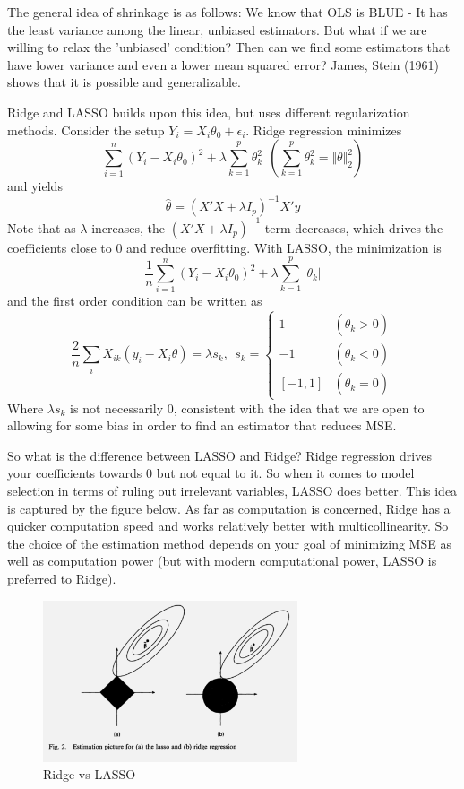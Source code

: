 The general idea of shrinkage is as follows: We know that OLS is BLUE - It has the least variance among the linear, unbiased estimators. But what if we are willing to relax the 'unbiased' condition? Then can we find some estimators that have lower variance and even a lower mean squared error? James, Stein (1961) shows that it is possible and generalizable. \par 
Ridge and LASSO builds upon this idea, but uses different regularization methods. Consider the setup $Y_i=X_i\theta_0+\epsilon_i$. Ridge regression minimizes
\[
\sum_{i=1}^n(Y_i-X_i\theta_0)^2+\lambda\sum_{k=1}^p \theta_k^2 \ \ \left(\sum_{k=1}^p \theta_k^2=\Vert \theta\Vert_2^2\right)
\]
and yields
\[
\hat{\theta} = (X'X+\lambda I_p)^{-1}X'y
\]
Note that as $\lambda$ increases, the $(X'X+\lambda I_p)^{-1}$ term decreases, which drives the coefficients close to 0 and reduce overfitting. With LASSO, the minimization is 
\[
\frac{1}{n}\sum_{i=1}^n(Y_i-X_i\theta_0)^2+\lambda\sum_{k=1}^p |\theta_k| 
\]
and the first order condition can be written as
\[
\frac{2}{n}\sum_i X_{ik}(y_i-X_i\theta)=\lambda s_k, \ \ s_k = \begin{cases}1 & (\hat{\theta}_k>0) \\ -1 & (\hat{\theta}_k<0)\\ [-1,1] & (\hat{\theta}_k=0)\end{cases}
\]
Where $\lambda s_k$ is not necessarily 0, consistent with the idea that we are open to allowing for some bias in order to find an estimator that reduces MSE. 
\par So what is the difference between LASSO and Ridge? Ridge regression drives your coefficients towards 0 but not equal to it. So when it comes to model selection in terms of ruling out irrelevant variables, LASSO does better. This idea is captured by the figure below. As far as computation is concerned, Ridge has a quicker computation speed and works relatively better with multicollinearity.  So the choice of the estimation method depends on your goal of minimizing MSE as well as computation power (but with modern computational power, LASSO is preferred to Ridge). 
\begin{figure}[H]
\centering
\includegraphics[width=0.67\textwidth, keepaspectratio]{lasso.png}
\caption{Ridge vs LASSO}
\end{figure}

